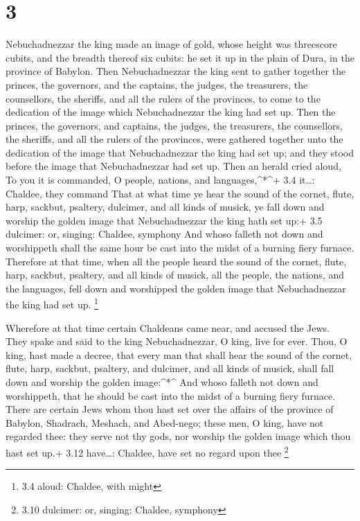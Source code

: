 \hypertarget{section-2}{%
\section{3}\label{section-2}}

 Nebuchadnezzar the king made an image of gold, whose height
was threescore cubits, and the breadth thereof six cubits: he set it up
in the plain of Dura, in the province of Babylon.  Then
Nebuchadnezzar the king sent to gather together the princes, the
governors, and the captains, the judges, the treasurers, the
counsellors, the sheriffs, and all the rulers of the provinces, to come
to the dedication of the image which Nebuchadnezzar the king had set up.
 Then the princes, the governors, and captains, the judges,
the treasurers, the counsellors, the sheriffs, and all the rulers of the
provinces, were gathered together unto the dedication of the image that
Nebuchadnezzar the king had set up; and they stood before the image that
Nebuchadnezzar had set up.  Then an herald cried aloud, To
you it is commanded, O people, nations, and languages,\^{}*\^{}+ 3.4
it\ldots: Chaldee, they command  That at what time ye hear
the sound of the cornet, flute, harp, sackbut, psaltery, dulcimer, and
all kinds of musick, ye fall down and worship the golden image that
Nebuchadnezzar the king hath set up:+ 3.5 dulcimer: or, singing:
Chaldee, symphony  And whoso falleth not down and
worshippeth shall the same hour be cast into the midst of a burning
fiery furnace.  Therefore at that time, when all the people
heard the sound of the cornet, flute, harp, sackbut, psaltery, and all
kinds of musick, all the people, the nations, and the languages, fell
down and worshipped the golden image that Nebuchadnezzar the king had
set up. \footnote{3.4 aloud: Chaldee, with might}

 Wherefore at that time certain Chaldeans came near, and
accused the Jews.  They spake and said to the king
Nebuchadnezzar, O king, live for ever.  Thou, O king, hast
made a decree, that every man that shall hear the sound of the cornet,
flute, harp, sackbut, psaltery, and dulcimer, and all kinds of musick,
shall fall down and worship the golden image:\^{}*\^{}  And
whoso falleth not down and worshippeth, that he should be cast into the
midst of a burning fiery furnace.  There are certain Jews
whom thou hast set over the affairs of the province of Babylon,
Shadrach, Meshach, and Abed-nego; these men, O king, have not regarded
thee: they serve not thy gods, nor worship the golden image which thou
hast set up.+ 3.12 have\ldots: Chaldee, have set no regard upon thee
\footnote{3.10 dulcimer: or, singing: Chaldee, symphony}

